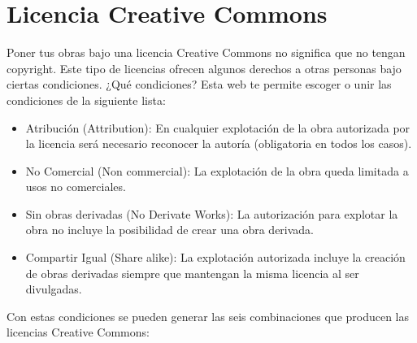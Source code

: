 \section{Licencia Creative Commons}
Poner tus obras bajo una licencia Creative Commons no significa que no tengan copyright. Este tipo de licencias ofrecen algunos derechos a otras personas bajo ciertas condiciones. ¿Qué condiciones? Esta web te permite escoger o unir las condiciones de la siguiente lista:

\begin{itemize}
\item Atribución (Attribution): En cualquier explotación de la obra autorizada por la licencia será necesario reconocer la autoría (obligatoria en todos los casos).
\item No Comercial (Non commercial): La explotación de la obra queda limitada a usos no comerciales.
\item Sin obras derivadas (No Derivate Works): La autorización para explotar la obra no incluye la posibilidad de crear una obra derivada.
\item Compartir Igual (Share alike): La explotación autorizada incluye la creación de obras derivadas siempre que mantengan la misma licencia al ser divulgadas.
\end{itemize}

Con estas condiciones se pueden generar las seis combinaciones que producen las licencias Creative Commons:

